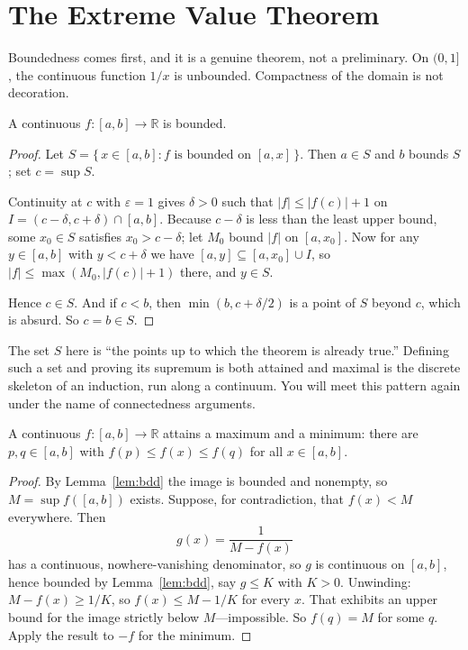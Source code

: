 \documentclass{essay}
\begin{document}
\section{The Extreme Value Theorem}

Boundedness comes first, and it is a genuine theorem, not a preliminary. On \((0,1]\), the continuous function \(1/x\) is unbounded. Compactness of the domain is not decoration.

\begin{lemma}[Boundedness]\label{lem:bdd}
  A continuous \(f : [a,b] \to \mathbb{R}\) is bounded.
\end{lemma}

\begin{proof}
  Let \(S = \{\, x \in [a,b] : f \text{ is bounded on } [a,x] \,\}\). Then \(a \in S\) and \(b\) bounds \(S\); set \(c = \sup S\).

  Continuity at \(c\) with \(\varepsilon = 1\) gives \(\delta > 0\) such that \(|f| \leq |f(c)| + 1\) on \(I = (c - \delta, c + \delta) \cap [a,b]\). Because \(c - \delta\) is less than the least upper bound, some \(x_{0} \in S\) satisfies \(x_{0} > c - \delta\); let \(M_{0}\) bound \(|f|\) on \([a, x_{0}]\). Now for any \(y \in [a,b]\) with \(y < c + \delta\) we have \([a,y] \subseteq [a,x_{0}] \cup I\), so \(|f| \leq \max(M_{0}, |f(c)| + 1)\) there, and \(y \in S\).

  Hence \(c \in S\). And if \(c < b\), then \(\min(b, c + \delta/2)\) is a point of \(S\) beyond \(c\), which is absurd. So \(c = b \in S\).
\end{proof}

The set \(S\) here is ``the points up to which the theorem is already true.'' Defining such a set and proving its supremum is both attained and maximal is the discrete skeleton of an induction, run along a continuum. You will meet this pattern again under the name of connectedness arguments.

\begin{theorem}\label{thm:evt}
  A continuous \(f : [a,b] \to \mathbb{R}\) attains a maximum and a minimum: there are \(p, q \in [a,b]\) with \(f(p) \leq f(x) \leq f(q)\) for all \(x \in [a,b]\).
\end{theorem}

\begin{proof}
  By Lemma~\ref{lem:bdd} the image is bounded and nonempty, so \(M = \sup f([a,b])\) exists. Suppose, for contradiction, that \(f(x) < M\) everywhere. Then
  \[ g(x) = \frac{1}{M - f(x)} \]
  has a continuous, nowhere-vanishing denominator, so \(g\) is continuous on \([a,b]\), hence bounded by Lemma~\ref{lem:bdd}, say \(g \leq K\) with \(K > 0\). Unwinding: \(M - f(x) \geq 1/K\), so \(f(x) \leq M - 1/K\) for every \(x\). That exhibits an upper bound for the image strictly below \(M\)---impossible. So \(f(q) = M\) for some \(q\). Apply the result to \(-f\) for the minimum.
\end{proof}
\end{document}
